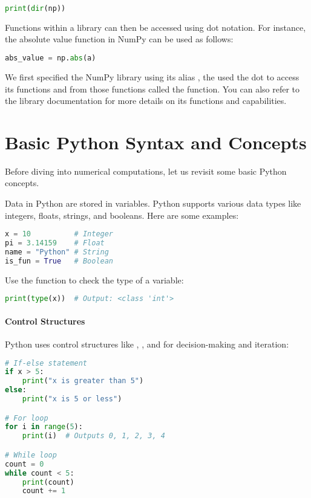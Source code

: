 \begin{lstlisting}[language=Python, style=mystyle2]
print(dir(np))
\end{lstlisting}

Functions within a library can then be accessed using dot notation. For instance, the absolute value function in NumPy can be used as follows:

\begin{lstlisting}[language=Python, style=mystyle2]
abs_value = np.abs(a)
\end{lstlisting}

We first specified the NumPy library using its alias , the used the dot to access its functions and from those functions called the  function.
You can also refer to the library documentation for more details on its functions and capabilities.

\section*{Basic Python Syntax and Concepts}

Before diving into numerical computations, let us revisit some basic Python concepts.

Data in Python are stored in variables. Python supports various data types like integers, floats, strings, and booleans. Here are some examples:

\begin{lstlisting}[language=Python, style=mystyle2]
x = 10          # Integer
pi = 3.14159    # Float
name = "Python" # String
is_fun = True   # Boolean
\end{lstlisting}

Use the  function to check the type of a variable:

\begin{lstlisting}[language=Python, style=mystyle2]
print(type(x))  # Output: <class 'int'>
\end{lstlisting}

\paragraph*{Control Structures}

Python uses control structures like , , and  for decision-making and iteration:

\begin{lstlisting}[language=Python, style=mystyle2]
# If-else statement
if x > 5:
    print("x is greater than 5")
else:
    print("x is 5 or less")

# For loop
for i in range(5):
    print(i)  # Outputs 0, 1, 2, 3, 4

# While loop
count = 0
while count < 5:
    print(count)
    count += 1
\end{lstlisting}

